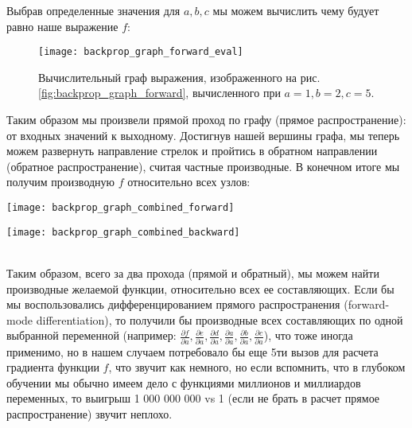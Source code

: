 


\newpage
Выбрав определенные значения для $a, b, c$ мы можем вычислить чему будует равно 
наше выражение $f$:
\begin{figure}[h!]
    \centering
    \texttt{[image: backprop\_graph\_forward\_eval]}
    \caption{Вычислительный граф выражения, изображенного на рис. 
    \ref{fig:backprop_graph_forward}, вычисленного при $a=1, b=2, c=5$.}
    \label{fig:backprop_graph_forward_eval}
\end{figure}

Таким образом мы произвели прямой проход по графу (прямое распространение): 
от входных значений к выходному. Достигнув нашей вершины графа, мы 
теперь можем развернуть направление стрелок и пройтись в обратном направлении 
(обратное распространение), считая частные производные. В конечном итоге мы получим 
производную $f$ относительно всех узлов:

\begin{minipage}{0.45\textwidth}
    \texttt{[image: backprop\_graph\_combined\_forward]}
    \label{fig:backprop_graph_combined_forward}
\end{minipage}
\hfill
\begin{minipage}{0.45\textwidth}
    \texttt{[image: backprop\_graph\_combined\_backward]}
    \label{fig:backprop_graph_combined_backward}
\end{minipage}\\

Таким образом, всего за два прохода (прямой и обратный), мы можем 
найти производные желаемой функции, относительно всех ее составляющих. 
Если бы мы воспользовались дифференцированием прямого распространения 
(forward-mode differentiation), то получили бы производные всех составляющих 
по одной выбранной переменной (например: 
$\frac{\partial f}{\partial a}, \frac{\partial e}{\partial a}, 
\frac{\partial d}{\partial a}, \frac{\partial a}{\partial a}, 
\frac{\partial b}{\partial a}, \frac{\partial c}{\partial a}$), 
что тоже иногда применимо, но в нашем случаем потребовало бы еще 5ти вызов 
для расчета градиента функции $f$, что звучит как немного, но если 
вспомнить, что в глубоком обучении мы обычно имеем дело с функциями 
миллионов и миллиардов переменных, то выигрыш 1 000 000 000 vs 1 (если не брать в расчет 
прямое распространение) звучит неплохо.


